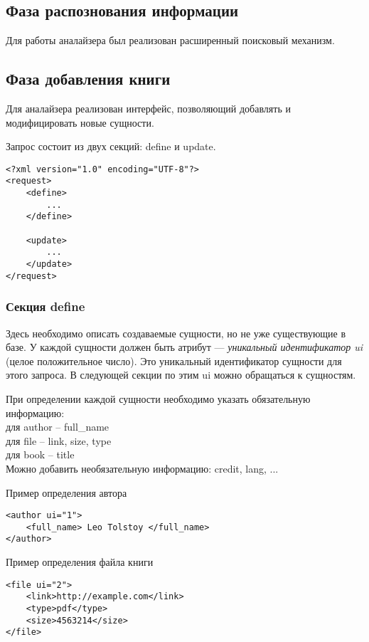 \subsection{Фаза распознования информации}

Для работы аналайзера был реализован расширенный поисковый механизм.


\subsection{Фаза добавления книги}


Для аналайзера реализован интерфейс, позволяющий добавлять и модифицировать новые сущности.

Запрос состоит из двух секций: define и update. 

\begin{verbatim}
<?xml version="1.0" encoding="UTF-8"?>
<request>
    <define>
        ...
    </define>

    <update>
        ...
    </update>
</request>
\end{verbatim}


\subsubsection{Секция define}

Здесь необходимо описать создаваемые сущности, но не уже существующие в базе. У каждой сущности должен быть атрибут --- {\em уникальный идентификатор ui} (целое положительное число). Это уникальный идентификатор сущности для этого запроса. В следующей секции по этим ui можно обращаться к сущностям. 

При определении каждой сущности необходимо указать обязательную информацию: \\
для author -- full\_name \\
для file -- link, size, type\\
для book -- title \\


Можно добавить необязательную информацию: credit, lang, ... 

Пример определения автора 
\begin{verbatim}
<author ui="1">
    <full_name> Leo Tolstoy </full_name>
</author>
\end{verbatim}

Пример определения файла книги 
\begin{verbatim}
<file ui="2">
    <link>http://example.com</link>
    <type>pdf</type>
    <size>4563214</size>
</file>
\end{verbatim}

